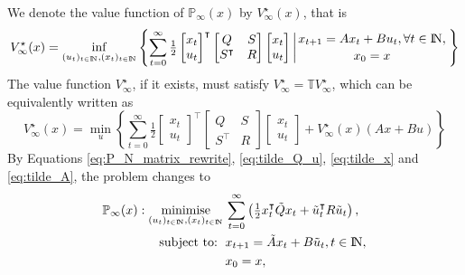 \documentclass[a4paper,11pt,reqno]{amsart}
\newcommand{\N}{{\rm I\!N}}
\newcommand{\tran}{\intercal}
\DeclareMathOperator*{\minimise}{minimise}
\begin{document}
We denote the value function of $\mathbb{P}_{\infty}(x)$ by $V_{\infty}^{\star}(x)$, that is
\begin{equation}
    V_{\infty}^{\star}(x)=\inf_{(u_t)_{t\in \N},(x_t)_{t\in \N}}
    \left\{
    \sum_{t=0}^{\infty}\tfrac{1}{2}
        \begin{bmatrix}
            x_t\\
            u_t
        \end{bmatrix}^{\tran}
        \begin{bmatrix}
            Q&S\\
            S^{\tran}&R
        \end{bmatrix}
        \begin{bmatrix}
            x_t\\
            u_t
        \end{bmatrix}
        \left\lvert
            x_{t+1}=Ax_t+Bu_t,\forall t\in\N,\atop
            x_0=x
        \right. 
    \right\} 
\end{equation}
The value function $V^{\star}_{\infty}$, if it exists, must satisfy $V^{\star}_{\infty}=\mathbb{T}V^{\star}_{\infty}$, which can be equivalently written as
\begin{equation}
    V_{\infty}^{\star}(x)=\min_u
    \left\{
    \sum_{t=0}^{\infty}\tfrac{1}{2}
        \begin{bmatrix}
            x_t\\
            u_t
        \end{bmatrix}^{\tran}
        \begin{bmatrix}
            Q&S\\
            S^{\tran}&R
        \end{bmatrix}
        \begin{bmatrix}
            x_t\\
            u_t
        \end{bmatrix}
        +V_{\infty}^{\star}(x)(Ax+Bu)
    \right\} 
\end{equation}
By Equations \eqref{eq:P_N_matrix_rewrite}, \eqref{eq:tilde_Q_u}, \eqref{eq:tilde_x} and \eqref{eq:tilde_A}, the problem changes to 
\begin{subequations}
    \begin{align}
        \mathbb{P}_{\infty}(x): \minimise_{(u_t)_{t\in \N},(x_t)_{t\in \N}} \,
         & \sum_{t=0}^{\infty}\left(\textstyle\frac{1}{2}
         x_t^{\tran}\tilde{Q}x_t+\tilde{u}_t^{\tran}R\tilde{u}_t\right),
        \\
        \text{subject to: }\,
         & x_{t+1} = \tilde{A}x_t+B\tilde{u}_t, t\in\N,
        \\
         & x_{0} = x,
    \end{align}
\end{subequations}
\end{document}
